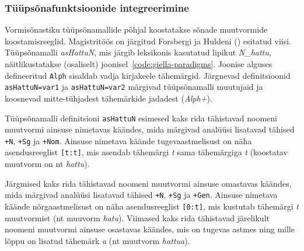 \documentclass[12pt,a4paper]{article}
\begin{document}
% 
% 
% 
%


\subsubsection{Tüüpsõnafunktsioonide integreerimine}
\label{sec:giella-tüüpsõnad}

Vormisõnastiku tüüpsõnamallide põhjal koostatakse sõnade muutvormide koostamis\-reeglid. Magistritöös on järgitud Forsbergi ja Huldeni (\citeyear{forsberg_learning_2016}) esitatud viisi. %
Tüüp\-sõna\-malli \textit{asHattuN}, mis järgib leksikonis kasutatud lipikut \textit{N\_hattu}, näitlikustatakse (osaliselt) joonisel~\ref{code:giella-paradigms}. Joonise alguses defineeritud \texttt{Alph} sisaldab vadja kirjakeele tähemärgid. Järgnevad definitsioonid \texttt{asHattuN=var1} ja \texttt{asHattuN=var2} märgivad tüüp\-sõna\-malli muutujaid ja koosnevad mitte-tühjadest tähe\-märkide jadadest (\textit{Alph+}).

Tüüp\-sõna\-malli definitsioni \texttt{asHattuN} esimesed kaks rida tähistavad noomeni muutvormi ainsuse nimetavas käändes, mida märgivad analüüsi lisatavad tähised \texttt{+N}, \texttt{+Sg} ja \texttt{+Nom}. Ainsuse nimetava käände tugeva\-astmelisust on näha asendus\-reeglist \texttt{[{t}:{t}]}, mis asendab tähemärgi \textit{t} sama tähemärgiga \textit{t} (koostatav muutvorm on nt \textit{hattu}).

Järgmised kaks rida tähistavad noomeni muutvormi ainsuse omastavas käändes, mida  märgivad analüüsi lisatavad tähised \texttt{+N}, \texttt{+Sg} ja \texttt{+Gen}. Ainsuse nimetava käände nõrga\-astmelisust on näha asendus\-reeglist \texttt{[0:{t}]}, mis kustutab tähemärgi \textit{t} muutvormist (nt muuvorm \textit{hatu}). Viimased kaks rida tähistavad järelikult noomeni muutvormi ainsuse osastavas käändes, mis on tugevas astmes ning mille lõppu on lisatud tähemärk \textit{a} (nt muutvorm \textit{hattua}).
\end{document}
